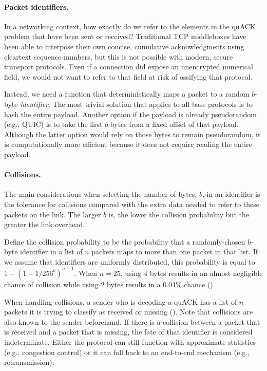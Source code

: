 \paragraph{Packet identifiers.}

In a networking context, how exactly do we refer to the elements
in the quACK problem that have been sent or received?
Traditional TCP middleboxes have been able to interpose their
own concise, cumulative acknowledgments using cleartext sequence numbers, but
this is not possible with modern, secure transport protocols. Even if a
connection did expose an unencrypted numerical field, we would not want to
refer to that field at risk of ossifying that protocol.

Instead, we need a function that deterministically maps
a packet to a random $b$-byte \emph{identifier}. The most trivial solution
that applies to all base protocols is
to hash the entire payload. Another option if the payload is already
pseudorandom (e.g., QUIC) is to take the first $b$ bytes from a fixed
offset of that payload. Although the latter option would rely on those bytes
to remain pseudorandom, it is computationally more efficient because it
does not require reading the entire payload.

\paragraph{Collisions.}
The main considerations when selecting the number of bytes, $b$, in an
identifier is the tolerance for collisions compared with the extra data
needed to refer to these packets on the link. The larger $b$ is, the lower
the collision probability but the greater the link overhead.

Define the collision probability to be the probability that a randomly-chosen
$b$-byte identifier in a list of $n$ packets maps to more than one packet in
that list.
If we assume that identifiers are uniformly distributed,
this probability is equal to $1-(1 - 1/256^{b})^{n-1}$.
When $n=25$, using $4$ bytes results in an almost negligible chance of
collision while using $2$ bytes results in a 0.04\% chance
().


When handling collisions, a sender who is decoding a quACK has a list of $n$
packets it is trying to classify as received or missing
(). Note that collisions are also known to the
sender beforehand. If there is a collision between a packet that is received
and a packet that is missing, the fate of that identifier is considered
indeterminate. Either the protocol can still function with approximate
statistics (e.g., congestion control) or it can fall back to an end-to-end
mechanism (e.g., retransmission).

